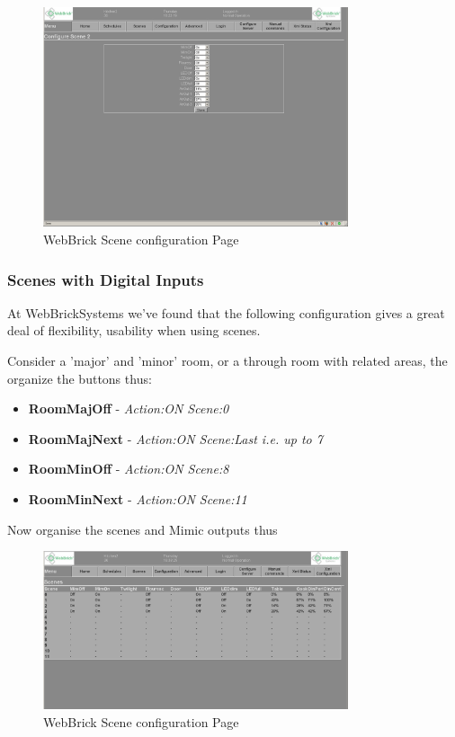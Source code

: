 \begin{figure}[H]
\centering
\includegraphics[width=0.8\textwidth]{Images/Scene.png}
\caption{WebBrick Scene configuration Page}
\end{figure}


\subsubsection{Scenes with Digital Inputs}

 At WebBrickSystems we've found that the following configuration gives a great deal of flexibility, usability when using scenes.
 
 Consider a 'major' and 'minor' room, or a through room with related areas, the organize the buttons thus:
 
	\begin{itemize}
		\item{\bf RoomMajOff} - {\em Action:ON Scene:0}
		\item{\bf RoomMajNext} - {\em Action:ON Scene:Last i.e. up to 7}
		\item{\bf RoomMinOff} - {\em Action:ON Scene:8}
		\item{\bf RoomMinNext} - {\em Action:ON Scene:11}
	\end{itemize}

 Now organise the scenes and Mimic outputs thus 

\begin{figure}[H]
\centering
\includegraphics[width=0.8\textwidth]{Images/SceneMimics.png}
\caption{WebBrick Scene configuration Page}
\end{figure}

